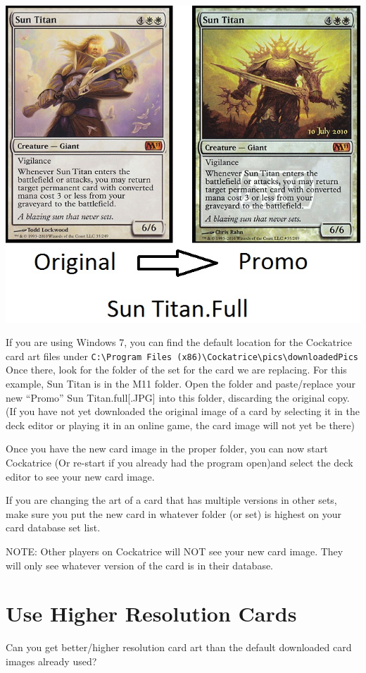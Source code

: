 \documentclass[a4paper]{scrbook}
\newcommand{\shellcmd}[1]{\texttt{\scriptsize #1}}
\begin{document}
\begin{center}
 \includegraphics[scale=0.5]{pics/fetch74e3}
\end{center}
If you are using Windows 7, you can find the default location for the Cockatrice card art files under \shellcmd{C:\textbackslash Program Files (x86)\textbackslash Cockatrice\textbackslash pics\textbackslash downloadedPics} Once there, look for the folder of the set for the card we are replacing. For this example, Sun Titan is in the M11 folder. Open the folder and paste/replace your new “Promo” Sun Titan.full[.JPG] into this folder, discarding the original copy. (If you have not yet downloaded the original image of a card by selecting it in the deck editor or playing it in an online game, the card image will not yet be there)

Once you have the new card image in the proper folder, you can now start Cockatrice (Or re-start if you already had the program open)and select the deck editor to see your new card image.

If you are changing the art of a card that has multiple versions in other sets, make sure you put the new card in whatever folder (or set) is highest on your card database set list.

NOTE: Other players on Cockatrice will NOT see your new card image. They will only see whatever version of the card is in their database. 

\section{Use Higher Resolution Cards}
Can you get better/higher resolution card art than the default downloaded card images already used?
\end{document}
